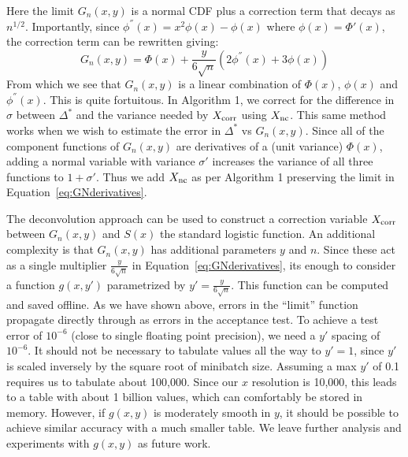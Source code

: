 \documentclass{article}
\begin{document}
Here the limit $G_n(x,y)$ is a normal CDF plus a correction term that decays as
$n^{1/2}$.
Importantly, since $\phi^{''}(x) = x^2\phi(x) - \phi(x)$ where
$\phi(x)=\Phi'(x)$, the correction term can be rewritten giving:
\begin{equation}\label{eq:GNderivatives}
    G_n(x,y) = \Phi(x) + \frac{y}{6\sqrt{n}}(2\phi^{''}(x)+3\phi(x))
\end{equation}
From which we see that $G_n(x,y)$ is a linear combination of $\Phi(x)$,
$\phi(x)$ and $\phi^{''}(x)$. This is quite fortuitous. In Algorithm 1, we
correct for the difference in $\sigma$ between $\Delta^*$ and the variance
needed by $X_{\rm corr}$ using $X_{\rm nc}$. This same method works when we
wish to estimate the error in $\Delta^*$ vs $G_n(x,y)$. Since all of the
component functions of $G_n(x,y)$ are derivatives of a (unit variance)
$\Phi(x)$, adding a normal variable with variance $\sigma'$ increases the
variance of all three functions to $1+\sigma'$. Thus we add $X_{\rm nc}$ as
per Algorithm 1 preserving the limit in Equation~\ref{eq:GNderivatives}.

The deconvolution approach can be used to construct a correction variable
$X_{\rm corr}$ between $G_n(x,y)$ and $S(x)$ the standard logistic function. An
additional complexity is that $G_n(x,y)$ has additional parameters $y$ and $n$.
Since these act as a single multiplier $\frac{y}{6\sqrt{n}}$ in
Equation~\ref{eq:GNderivatives}, its enough to consider a function $g(x,y')$
parametrized by $y'= \frac{y}{6\sqrt{n}}$. This function can be computed and
saved offline. As we have shown above, errors in the ``limit'' function
propagate directly through as errors in the acceptance test.  To achieve a test
error of $10^{-6}$ (close to single floating point precision), we need a $y'$
spacing of $10^{-6}$. It should not be necessary to tabulate values all the way to
$y'=1$, since $y'$ is scaled inversely by the square root of minibatch size.
Assuming a max $y'$ of 0.1 requires us to tabulate about 100,000.  Since our $x$
resolution is 10,000, this leads to a table with about 1 billion values, which
can comfortably be stored in memory.  However, if $g(x,y)$ is moderately smooth
in $y$, it should be possible to achieve similar accuracy with a much smaller
table. We leave further analysis and experiments with $g(x,y)$ as future work.
\end{document}
